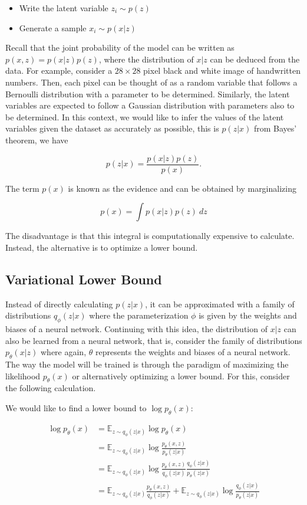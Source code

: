 \documentclass[twocolumn, 9pt]{article}
\begin{document}
\begin{itemize}
\item Write the latent variable $ z_i \sim p(z)$ \
\item Generate a sample $x_i \sim p(x | z)$
\end{itemize}

Recall that the joint probability of the model can be written as $ p(x, z) = p(x | z)p(z) $, where the distribution of $ x | z$ can be deduced from the data. For example, consider a $28\times28$ pixel black and white image of handwritten numbers. Then, each pixel can be thought of as a random variable that follows a Bernoulli distribution with a parameter to be determined. Similarly, the latent variables are expected to follow a Gaussian distribution with parameters also to be determined. In this context, we would like to infer the values of the latent variables given the dataset as accurately as possible, this is $p(z | x)$ from Bayes' theorem, we have 

$$
p(z | x) = \frac{p(x | z)p(z)}{p(x)}.
$$

The term $p(x)$ is known as the evidence and can be obtained by marginalizing

$$
p(x) = \int p(x | z)p(z) ~ dz
$$

The disadvantage is that this integral is computationally expensive to calculate. Instead, the alternative is to optimize a lower bound.  \\

\subsection{Variational Lower Bound}

Instead of directly calculating $p (z | x)$, it can be approximated with a family of distributions $q_\phi(z | x)$ where the parameterization $\phi$ is given by the weights and biases of a neural network. Continuing with this idea, the distribution of $x | z$ can also be learned from a neural network, that is, consider the family of distributions $p_\theta(x | z)$ where again, $\theta$ represents the weights and biases of a neural network. The way the model will be trained is through the paradigm of maximizing the likelihood $p_\theta(x)$ or alternatively optimizing a lower bound. For this, consider the following calculation. \

We would like to find a lower bound to \(\log p_\theta(x)\):

\begin{align*}
\log p_\theta(x) &= \mathbb{E}_{z\sim q_\phi(z|x)} \log p_\theta(x) \\
&= \mathbb{E}_{z\sim q_\phi(z|x)} \log \frac{p_\theta(x,z)}{p_\theta(z|x)} \\
&= \mathbb{E}_{z\sim q_\phi(z|x)} \log \frac{p_\theta(x,z)}{q_\phi(z|x)} \frac{q_\phi(z|x)}{p_\theta(z | x)} \\
&= \mathbb{E}_{z\sim q_\phi(z|x)} \frac{p_\theta(x,z)}{q_\phi(z|x)} + \mathbb{E}_{z\sim q_\phi(z|x)} \log \frac{q_\phi(z|x)}{p_\theta(z | x)}
\end{align*}
\end{document}

